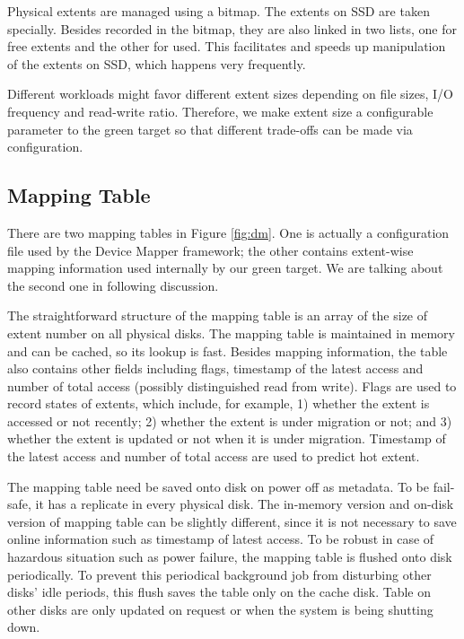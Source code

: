 Physical extents are managed using a bitmap. The extents on SSD are
taken specially. Besides recorded in the bitmap, they are also linked
in two lists, one for free extents and the other for used. This
facilitates and speeds up manipulation of the extents on SSD, which
happens very frequently.

Different workloads might favor different extent sizes depending on
file sizes, I/O frequency and read-write ratio. Therefore, we make
extent size a configurable parameter to the green target so that
different trade-offs can be made via configuration. 


\subsection{Mapping Table}

There are two mapping tables in Figure \ref{fig:dm}. One is actually a
configuration file used by the Device Mapper framework; the other
contains extent-wise mapping information used internally by our green
target. We are talking about the second one in following discussion. 

The straightforward structure of the mapping table is an array of the
size of extent number on all physical disks. The mapping table is
maintained in memory and can be cached, so its lookup is fast. Besides
mapping information, the table also contains other fields including
flags, timestamp of the latest access and number of total access
(possibly distinguished read from write). Flags are used to record
states of extents, which include, for example, 1) whether the extent
is accessed or not recently; 2) whether the extent is under migration
or not; and 3) whether the extent is updated or not when it is under
migration. Timestamp of the latest access and number of total access
are used to predict hot extent. 

The mapping table need be saved onto disk on power off as metadata. To
be fail-safe, it has a replicate in every physical disk. The in-memory
version and on-disk version of mapping table can be slightly
different, since it is not necessary to save online information such
as timestamp of latest access. To be robust in case of hazardous
situation such as power failure, the mapping table is flushed onto
disk periodically. To prevent this periodical background job from
disturbing other disks' idle periods, this flush saves the table only
on the cache disk. Table on other disks are only updated on request or
when the system is being shutting down.

